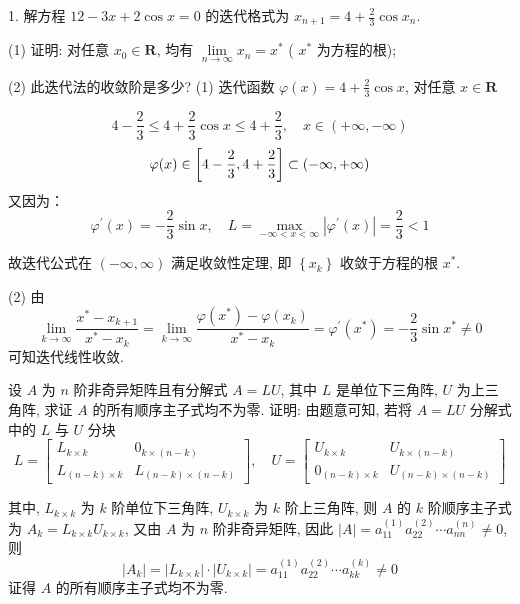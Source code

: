 \documentclass[a4paper,fontsize=8pt]{kaobook}
\begin{document}
\begin{tcolorbox}[enhanced,colback=green!10!white,colframe=green!50!white,breakable,coltitle=green!25!black,title=2024]
1. 解方程 $ 12-3 x+2 \cos x=0 $ 的迭代格式为 $ x_{n+1}=4+\frac{2}{3} \cos x_{n} $.

(1) 证明: 对任意 $ x_{0} \in \mathbf{R} $, 均有 $ \lim\limits _{n \rightarrow \infty} x_{n}=x^{*} $ ( $ x^{*} $ 为方程的根);

(2) 此迭代法的收敛阶是多少?
 \tcblower
 (1) 迭代函数 $ \varphi(x)=4+\frac{2}{3} \cos x $, 对任意 $ x \in \mathbf{R} $

$$
4-\frac{2}{3} \leqslant 4+\frac{2}{3} \cos x \leqslant 4+\frac{2}{3},\quad x \in(+\infty,-\infty)
$$
$$
\varphi(x) \in\left[4-\frac{2}{3}, 4+\frac{2}{3}\right] \subset(-\infty,+\infty) \\
$$
又因为：
$$
\varphi^{\prime}(x)=-\frac{2}{3} \sin x, \quad L=\max _{-\infty<x<\infty}\left|\varphi^{\prime}(x)\right|=\frac{2}{3}<1
$$

故迭代公式在 $ (-\infty, \infty) $ 满足收敛性定理, 即 $ \left\{x_{k}\right\} $ 收敛于方程的根 $ x^{*} $.

(2) 由
$$
\lim _{k \rightarrow \infty} \frac{x^{*}-x_{k+1}}{x^{*}-x_{k}}=\lim _{k \rightarrow \infty} \frac{\varphi\left(x^{*}\right)-\varphi\left(x_{k}\right)}{x^{*}-x_{k}}=\varphi^{\prime}\left(x^{*}\right)=-\frac{2}{3} \sin x^{*} \neq 0
$$
可知迭代线性收敛.
\end{tcolorbox}

\begin{tcolorbox}[enhanced,colback=blue!8!white,colframe=blue!25!white,breakable,title=2024]

设 $ A $ 为 $ n $ 阶非奇异矩阵且有分解式 $ A=L U $, 其中 $ L $ 是单位下三角阵, $ U $ 为上三角阵, 求证 $ A $ 的所有顺序主子式均不为零.
\tcblower
证明: 由题意可知, 若将 $ A=L U $ 分解式中的 $ L $ 与 $ U $ 分块
$$
L=\left[\begin{array}{cc}
L_{k \times k} & 0_{k \times(n-k)} \\
L_{(n-k) \times k} & L_{(n-k) \times(n-k)}
\end{array}\right], \quad U=\left[\begin{array}{cc}
U_{k \times k} & U_{k \times(n-k)} \\
0_{(n-k) \times k} & U_{(n-k) \times(n-k)}
\end{array}\right]
$$

其中, $ L_{k \times k} $ 为 $ k $ 阶单位下三角阵, $ U_{k \times k} $ 为 $ k $ 阶上三角阵, 则 $ A $ 的 $ k $ 阶顺序主子式为 $ A_{k}=L_{k \times k} U_{k \times k} $, 又由 $ A $ 为 $ n $ 阶非奇异矩阵, 因此 $ |A|=a_{11}^{(1)} a_{22}^{(2)} \cdots a_{n n}^{(n)} \neq 0 $,则
$$
\left|A_{k}\right|=\left|L_{k \times k}\right| \cdot\left|U_{k \times k}\right|=a_{11}^{(1)} a_{22}^{(2)} \cdots a_{k k}^{(k)} \neq 0
$$
证得 $ A $ 的所有顺序主子式均不为零.

\end{tcolorbox}
\end{document}
